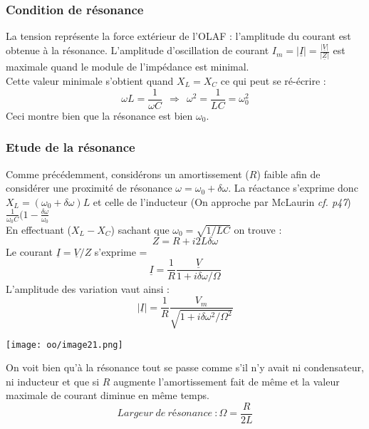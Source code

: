 \documentclass[british,french,11pt, a4paper, openany]{book}
\begin{document}
		\subsubsection{Condition de résonance}
		La tension représente la force extérieur de l'OLAF : l'amplitude du courant est obtenue à la résonance. L'amplitude d'oscillation de courant $I_m = |\underline{I}| = \frac{|\underline{V}|}{|\underline{Z}|}$ est maximale quand le module de l'impédance est minimal.\\
		Cette valeur minimale s'obtient quand $X_L = X_C$ ce qui peut se ré-écrire :
		\begin{equation}
			\omega L = \frac{1}{\omega C}\ \ \Rightarrow\ \ \omega^2 = \frac{1}{LC} = \omega_0^2
		\end{equation}
		Ceci montre bien que la résonance est bien $\omega_0$.
		
		\subsubsection{Etude de la résonance}
		Comme précédemment, considérons un amortissement ($R$) faible afin de considérer une proximité de résonance $\omega = \omega_0 + \delta\omega$. La réactance s'exprime donc $X_L = (\omega_0 + \delta\omega)L$ et celle de l'inducteur (On approche par McLaurin \textit{cf. p47}) $\frac{1}{\omega_0 C}(1-\frac{\delta\omega}{\omega_0}$\\
		
		En effectuant ($X_L - X_C$) sachant que $\omega_0 = \sqrt{1/LC}$ on trouve :
		\begin{equation}
			Z = R + i2L\delta\omega
		\end{equation}
		Le courant $\underline{I} = \underline{V}/Z$ s'exprime =
		\begin{equation}
			\underline{I} = \frac{1}{R}\frac{\underline{V}}{1+i\delta\omega/\Omega}
		\end{equation}
		L'amplitude des variation vaut ainsi :
		\begin{equation}
			|\underline{I}| = \frac{1}{R}\frac{V_m}{\sqrt{1+i\delta\omega^2/\Omega^2}}
		\end{equation}
		
		\begin{center}
			\texttt{[image: oo/image21.png]}
		\end{center}
		On voit bien qu'à la résonance tout se passe comme s'il n'y avait ni condensateur, ni inducteur et que si $R$ augmente l'amortissement fait de même et la valeur maximale de courant diminue en même temps.
		\begin{equation}
			Largeur\ de\ résonance\ : \Omega = \frac{R}{2L}
		\end{equation}
		
\end{document}
